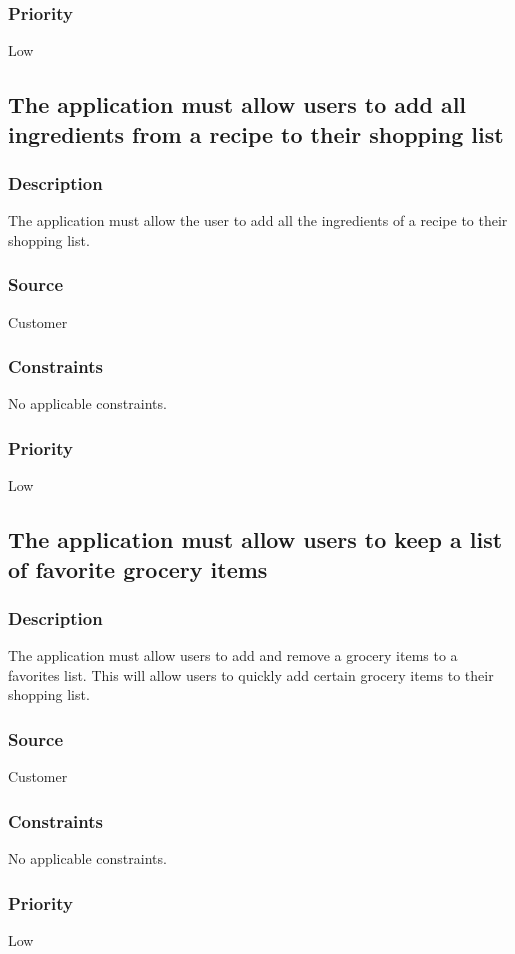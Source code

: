 \subsubsection{Priority}
Low\\

\subsection{The application must allow users to add all ingredients from a recipe to their shopping list}
\subsubsection{Description}
The application must allow the user to add all the ingredients of a recipe to their shopping list.
\subsubsection{Source}
Customer
\subsubsection{Constraints}
No applicable constraints.
\subsubsection{Priority}
Low\\

\subsection{The application must allow users to keep a list of favorite grocery items}
\subsubsection{Description}
The application must allow users to add and remove a grocery items to a favorites list. This will allow users to quickly add certain grocery items to their shopping list.
\subsubsection{Source}
Customer
\subsubsection{Constraints}
No applicable constraints.
\subsubsection{Priority}
Low


